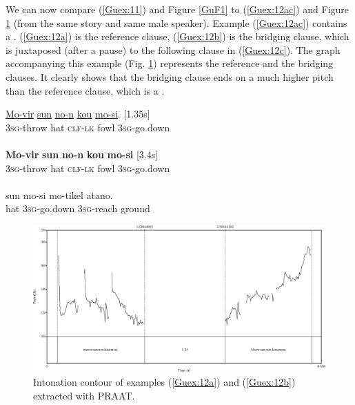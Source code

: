 \documentclass[output=paper]{LSP/langsci}
\begin{document}
We can now compare (\ref{Guex:11}) and Figure \ref{GuF1} to (\ref{Guex:12ac}) and Figure \ref{GuF2} (from the same story and same male speaker). Example (\ref{Guex:12ac}) contains a . (\ref{Guex:12a}) is the reference clause, (\ref{Guex:12b}) is the bridging clause, which is juxtaposed (after a pause) to the following clause in (\ref{Guex:12c}). The graph accompanying this example (Fig. \ref{GuF2}) represents the reference and the bridging clauses. It clearly shows that the bridging clause ends on a much higher pitch than the reference clause, which is a .


\begin{exe}
\ex \label{Guex:12ac}
\begin{xlist}
\ex \label{Guex:12a}
\gll \underline{Mo-vir}        \underline{sun}   \underline{no-n}          \underline{kou}   \underline{mo-si}. [1.35s]\\
\textsc{3sg}-throw   hat   \textsc{clf-lk}   fowl   \textsc{3sg}-go.down \\
\glt {}\\
\ex \label{Guex:12b}
\gll \textbf{Mo-vir}      \textbf{sun}    \textbf{no-n}           \textbf{kou}    \textbf{mo-si} [3.4s] \\
\textsc{3sg}-throw   hat   \textsc{clf-lk}   fowl   \textsc{3sg}-go.down\\
\glt {}\\
\ex \label{Guex:12c}
\gll sun    mo-si          mo-tikel        atano.\\     	       
hat    \textsc{3sg}-go.down   \textsc{3sg}-reach     ground\\
\glt {} 
\end{xlist}
\end{exe}

\begin{figure}[ht]
\includegraphics[width=\textwidth]{figures/guerinFig2.eps}
\caption{Intonation contour of examples (\ref{Guex:12a}) and (\ref{Guex:12b}) extracted with PRAAT. \label{GuF2}}
\end{figure}
\end{document}
